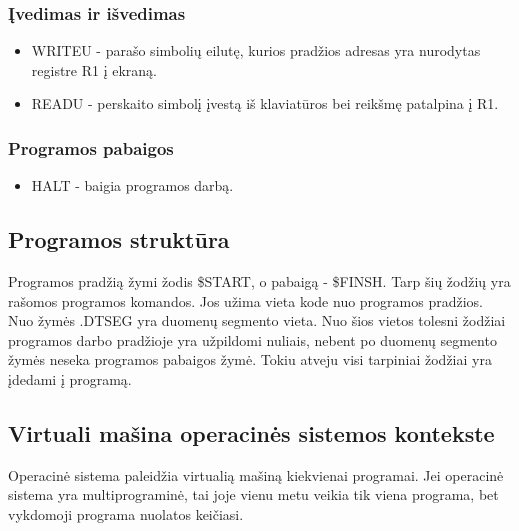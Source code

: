 \documentclass{VUMIFInfKursinis}
\begin{document}
\subsubsection{Įvedimas ir išvedimas}
\begin{itemize}
	\item WRITEU - parašo simbolių eilutę, kurios pradžios adresas yra nurodytas registre R1 į ekraną.
	\item READU - perskaito simbolį įvestą iš klaviatūros bei reikšmę patalpina į R1.
\end{itemize}

\subsubsection{Programos pabaigos}
\begin{itemize}
	\item HALT - baigia programos darbą.
\end{itemize}

\subsection{Programos struktūra}

Programos pradžią žymi žodis \$START, o pabaigą - \$FINSH. Tarp šių žodžių yra rašomos programos komandos. Jos užima vieta kode nuo programos pradžios. Nuo žymės .DTSEG yra duomenų segmento vieta. Nuo šios vietos tolesni žodžiai programos darbo pradžioje yra užpildomi nuliais, nebent po duomenų segmento žymės neseka programos pabaigos žymė. Tokiu atveju visi tarpiniai žodžiai yra įdedami į programą.

\subsection{Virtuali mašina operacinės sistemos kontekste}

Operacinė sistema paleidžia virtualią mašiną kiekvienai programai. Jei operacinė sistema yra multiprograminė, tai joje vienu metu veikia tik viena programa, bet vykdomoji programa nuolatos keičiasi.

\printbibliography[heading=bibintoc] %
\appendix  %
\end{document}
